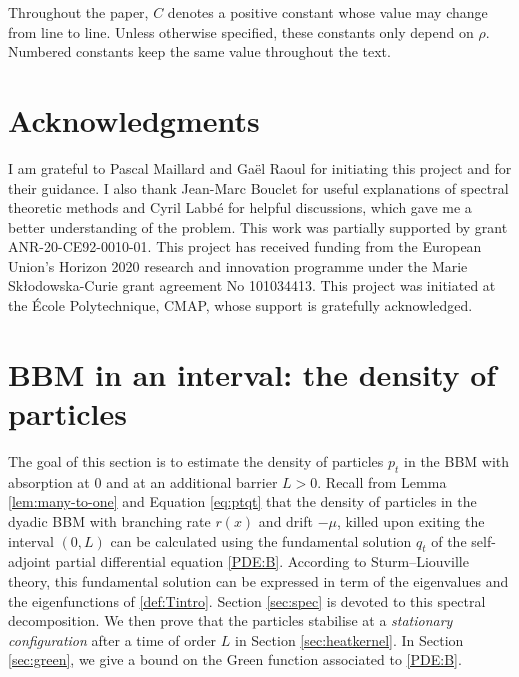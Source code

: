\documentclass[11pt]{article}
\theoremstyle{plain}
\begin{document}
Throughout the paper, $C$ denotes a positive constant whose value may change from line to line. Unless otherwise specified, these constants only depend on $\rho$. Numbered constants keep the same value throughout the text.

\section*{Acknowledgments}
I am grateful to Pascal Maillard and Gaël Raoul for initiating this project and for their guidance. I also thank Jean-Marc Bouclet for useful explanations of spectral theoretic methods and Cyril Labbé for helpful discussions, which gave me a better understanding of the problem. This work was partially supported by grant ANR-20-CE92-0010-01. This project has received funding from the European Union’s Horizon 2020 research and innovation programme under the Marie Skłodowska-Curie grant agreement No 101034413. This project was initiated at the École Polytechnique, CMAP, whose support is gratefully acknowledged.





\section[Branching Brownian motion in an interval: the density of particles]{BBM in an interval: the density of particles}\label{sec:density}
\setcounter{equation}{0}


The goal of this section is to estimate the density of particles $p_t$ in the BBM with absorption at $0$ and at an additional barrier $L>0$. Recall from Lemma \ref{lem:many-to-one} and Equation \eqref{eq:ptqt} that the density  of particles in the dyadic BBM with branching rate $r(x)$ and drift  $-\mu$, killed upon exiting the interval $(0,L)$ can be calculated using the fundamental solution $q_t$ of the self-adjoint partial differential equation \eqref{PDE:B}. According to Sturm--Liouville theory, this fundamental solution can be expressed in term of the eigenvalues and the eigenfunctions of  \eqref{def:Tintro}. Section \ref{sec:spec} is  devoted to this spectral decomposition. 
We then prove that the particles stabilise at a \textit{stationary configuration} after a time of order $L$ in Section 
\ref{sec:heatkernel}. In Section \ref{sec:green}, we give a bound on the Green function associated to \eqref{PDE:B}. 
\end{document}
